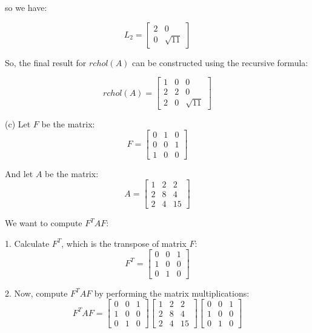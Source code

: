 \documentclass[12pt]{article}
\begin{document}
\begin{enumerate}[leftmargin=\labelsep]
so we have:

\[
L_2 = \begin{bmatrix}
2 &  0  \\ 
 0  & \sqrt{11} 
\end{bmatrix}
\]

So, the final result for \(rchol(A)\) can be constructed using the recursive formula:

\[
rchol(A) = \begin{bmatrix} 1 & 0 & 0 \\ 2 & 2 & 0 \\ 2 & 0 & \sqrt{11} \end{bmatrix}
\]

(c) 
Let $F$ be the matrix:
\[
F = \begin{bmatrix}
0 & 1 & 0 \\
0 & 0 & 1 \\
1 & 0 & 0
\end{bmatrix}
\]

And let $A$ be the matrix:
\[
A = \begin{bmatrix}
1 & 2 & 2 \\
2 & 8 & 4 \\
2 & 4 & 15
\end{bmatrix}
\]

We want to compute $F^TAF$:

1. Calculate $F^T$, which is the transpose of matrix $F$:
\[
F^T = \begin{bmatrix}
0 & 0 & 1 \\
1 & 0 & 0 \\
0 & 1 & 0
\end{bmatrix}
\]

2. Now, compute $F^TAF$ by performing the matrix multiplications:
\[
F^TAF = \begin{bmatrix}
0 & 0 & 1 \\
1 & 0 & 0 \\
0 & 1 & 0
\end{bmatrix}
\begin{bmatrix}
1 & 2 & 2 \\
2 & 8 & 4 \\
2 & 4 & 15
\end{bmatrix}
\begin{bmatrix}
0 & 0 & 1 \\
1 & 0 & 0 \\
0 & 1 & 0
\end{bmatrix}
\]


\end{enumerate}
\end{document}
